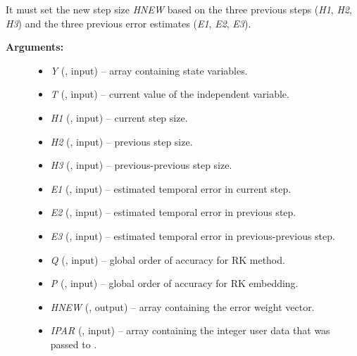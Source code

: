 \documentclass[letterpaper,10pt,english]{sphinxmanual}
\begin{document}
\begin{fulllineitems}
\label{f_interface/Usage:f/_/FARKADAPT}
It must set the new step size \emph{HNEW} based on the three previous
steps (\emph{H1}, \emph{H2}, \emph{H3}) and the three previous error estimates
(\emph{E1}, \emph{E2}, \emph{E3}).
\begin{description}
\item[{\textbf{Arguments:}}] \leavevmode\begin{itemize}
\item {} 
\emph{Y} (, input) -- array containing state variables.

\item {} 
\emph{T} (, input) -- current value of the independent variable.

\item {} 
\emph{H1} (, input) -- current step size.

\item {} 
\emph{H2} (, input) -- previous step size.

\item {} 
\emph{H3} (, input) -- previous-previous step size.

\item {} 
\emph{E1} (, input) -- estimated temporal error in current step.

\item {} 
\emph{E2} (, input) -- estimated temporal error in previous step.

\item {} 
\emph{E3} (, input) -- estimated temporal error in previous-previous step.

\item {} 
\emph{Q} (, input) -- global order of accuracy for RK method.

\item {} 
\emph{P} (, input) -- global order of accuracy for RK embedding.

\item {} 
\emph{HNEW} (, output) -- array containing the error weight vector.

\item {} 
\emph{IPAR} (, input) -- array containing the integer
user data that was passed to {\hyperref[f_interface/Usage:f/_/FARKMALLOC]{\emph{}}}.


\end{itemize}
\end{description}
\end{fulllineitems}
\end{document}
